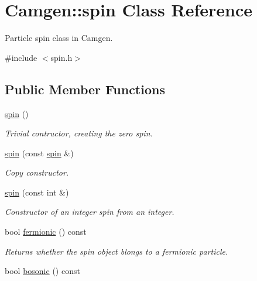 \hypertarget{a00514}{}\section{Camgen\+:\+:spin Class Reference}
\label{a00514}


Particle spin class in Camgen.  




{\ttfamily \#include $<$spin.\+h$>$}

\subsection*{Public Member Functions}
\begin{DoxyCompactItemize}
\item 
\hypertarget{a00514_a422237930fd513ffb06a1b00abd5b401}{}\hyperlink{a00514_a422237930fd513ffb06a1b00abd5b401}{spin} ()\label{a00514_a422237930fd513ffb06a1b00abd5b401}

\begin{DoxyCompactList}\small\item\em Trivial contructor, creating the zero spin. \end{DoxyCompactList}\item 
\hypertarget{a00514_a185c3feef1ced89bbde10c44e0f22f1c}{}\hyperlink{a00514_a185c3feef1ced89bbde10c44e0f22f1c}{spin} (const \hyperlink{a00514}{spin} \&)\label{a00514_a185c3feef1ced89bbde10c44e0f22f1c}

\begin{DoxyCompactList}\small\item\em Copy constructor. \end{DoxyCompactList}\item 
\hypertarget{a00514_a8fbfc2cbe5b80c415dfc6768032155c6}{}\hyperlink{a00514_a8fbfc2cbe5b80c415dfc6768032155c6}{spin} (const int \&)\label{a00514_a8fbfc2cbe5b80c415dfc6768032155c6}

\begin{DoxyCompactList}\small\item\em Constructor of an integer spin from an integer. \end{DoxyCompactList}\item 
\hypertarget{a00514_a82d6b1a4b924c35cb8d31170ee5268e5}{}bool \hyperlink{a00514_a82d6b1a4b924c35cb8d31170ee5268e5}{fermionic} () const \label{a00514_a82d6b1a4b924c35cb8d31170ee5268e5}

\begin{DoxyCompactList}\small\item\em Returns whether the spin object blongs to a fermionic particle. \end{DoxyCompactList}\item 
\hypertarget{a00514_a8bd2fdcc018f130c11c365ca086a050a}{}bool \hyperlink{a00514_a8bd2fdcc018f130c11c365ca086a050a}{bosonic} () const \label{a00514_a8bd2fdcc018f130c11c365ca086a050a}


\end{DoxyCompactItemize}

